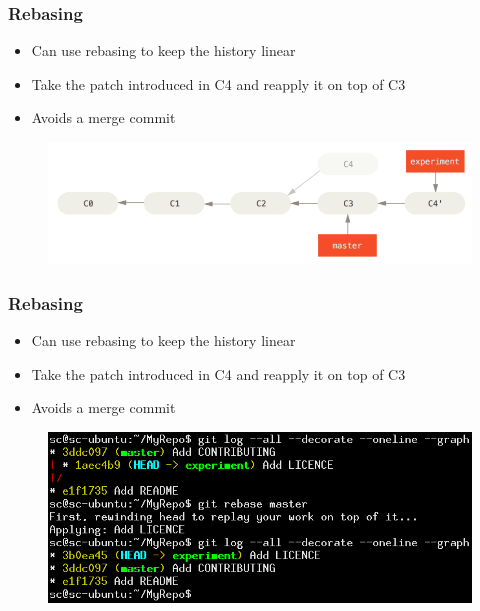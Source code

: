 \documentclass{beamer}
\begin{document}
\begin{frame}
	\frametitle{Rebasing}
	\begin{itemize}
		\item{Can use rebasing to keep the history linear}
		\item{Take the patch introduced in C4 and reapply it on top of C3}
		\item{Avoids a merge commit}
	\end{itemize}
	\begin{figure}
		\includegraphics[scale=0.4]{Rebasing-2.png}
	\end{figure}
\end{frame}

\begin{frame}
	\frametitle{Rebasing}
	\begin{itemize}
		\item{Can use rebasing to keep the history linear}
		\item{Take the patch introduced in C4 and reapply it on top of C3}
		\item{Avoids a merge commit}
	\end{itemize}
	\begin{figure}
		\includegraphics[scale=0.4]{Rebasing-3.png}
	\end{figure}
\end{frame}
\end{document}
